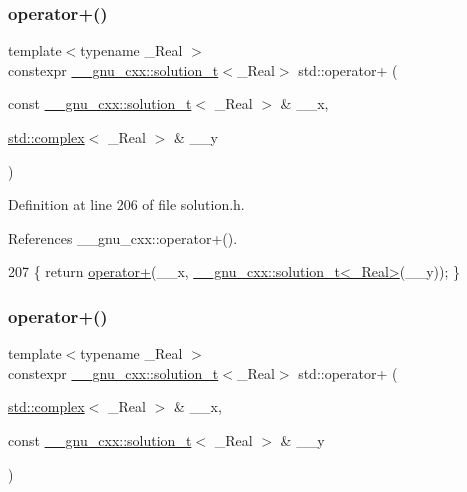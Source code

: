 \subsubsection{\texorpdfstring{operator+()}{operator+()}\hspace{0.1cm}{\footnotesize\ttfamily [5/6]}}
{\footnotesize\ttfamily template$<$typename \+\_\+\+Real $>$ \\
constexpr \hyperlink{namespace____gnu__cxx_ae20ea642de50eb361074c62676b0159c}{\+\_\+\+\_\+gnu\+\_\+cxx\+::solution\+\_\+t}$<$\+\_\+\+Real$>$ std\+::operator+ (\begin{DoxyParamCaption}\item[{const \hyperlink{namespace____gnu__cxx_ae20ea642de50eb361074c62676b0159c}{\+\_\+\+\_\+gnu\+\_\+cxx\+::solution\+\_\+t}$<$ \+\_\+\+Real $>$ \&}]{\+\_\+\+\_\+x,  }\item[{\hyperlink{classstd_1_1complex}{std\+::complex}$<$ \+\_\+\+Real $>$ \&}]{\+\_\+\+\_\+y }\end{DoxyParamCaption})}



Definition at line 206 of file solution.\+h.



References \+\_\+\+\_\+gnu\+\_\+cxx\+::operator+().


\begin{DoxyCode}
207     \{ \textcolor{keywordflow}{return} \hyperlink{namespacestd_aa471e6e6583f0beced389171490d8684}{operator+}(\_\_x, \hyperlink{namespace____gnu__cxx_ae20ea642de50eb361074c62676b0159c}{\_\_gnu\_cxx::solution\_t<\_Real>}(\_\_y)); \}
\end{DoxyCode}
\mbox{\label{namespacestd_aa471e6e6583f0beced389171490d8684}} 
\subsubsection{\texorpdfstring{operator+()}{operator+()}\hspace{0.1cm}{\footnotesize\ttfamily [6/6]}}
{\footnotesize\ttfamily template$<$typename \+\_\+\+Real $>$ \\
constexpr \hyperlink{namespace____gnu__cxx_ae20ea642de50eb361074c62676b0159c}{\+\_\+\+\_\+gnu\+\_\+cxx\+::solution\+\_\+t}$<$\+\_\+\+Real$>$ std\+::operator+ (\begin{DoxyParamCaption}\item[{\hyperlink{classstd_1_1complex}{std\+::complex}$<$ \+\_\+\+Real $>$ \&}]{\+\_\+\+\_\+x,  }\item[{const \hyperlink{namespace____gnu__cxx_ae20ea642de50eb361074c62676b0159c}{\+\_\+\+\_\+gnu\+\_\+cxx\+::solution\+\_\+t}$<$ \+\_\+\+Real $>$ \&}]{\+\_\+\+\_\+y }\end{DoxyParamCaption})}



